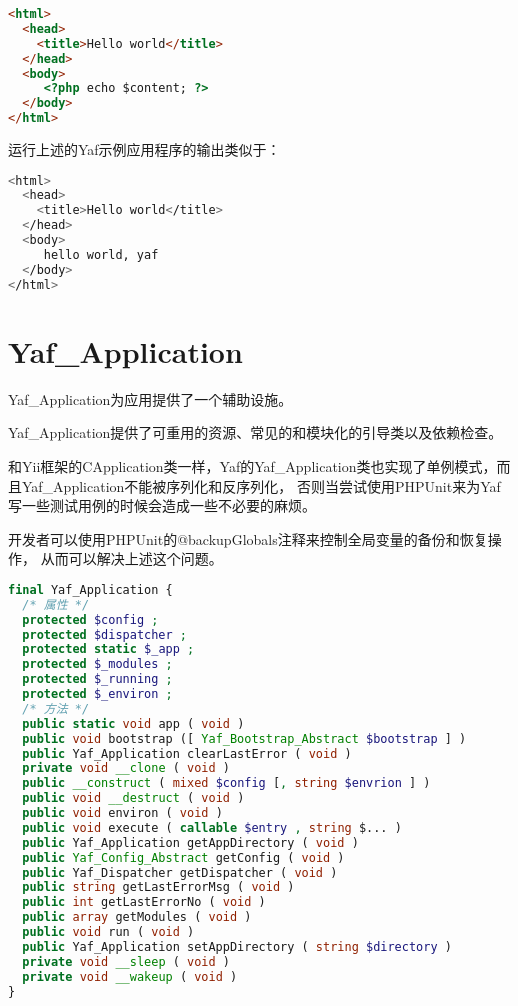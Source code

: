 \begin{lstlisting}[language=HTML]
<html>
  <head>
    <title>Hello world</title>
  </head>
  <body>
     <?php echo $content; ?>
  </body>
</html>
\end{lstlisting}

运行上述的Yaf示例应用程序的输出类似于：


\begin{lstlisting}[language=bash]
<html>
  <head>
    <title>Hello world</title>
  </head>
  <body>
     hello world, yaf
  </body>
</html>
\end{lstlisting}


\chapter{Yaf\_Application}

Yaf\_Application为应用提供了一个辅助设施。

Yaf\_Application提供了可重用的资源、常见的和模块化的引导类以及依赖检查。

和Yii框架的CApplication类一样，Yaf的Yaf\_Application类也实现了单例模式，而且Yaf\_Application不能被序列化和反序列化， 否则当尝试使用PHPUnit来为Yaf写一些测试用例的时候会造成一些不必要的麻烦。

开发者可以使用PHPUnit的@backupGlobals注释来控制全局变量的备份和恢复操作， 从而可以解决上述这个问题。




\begin{lstlisting}[language=PHP]
final Yaf_Application {
  /* 属性 */
  protected $config ;
  protected $dispatcher ;
  protected static $_app ;
  protected $_modules ;
  protected $_running ;
  protected $_environ ;
  /* 方法 */
  public static void app ( void )
  public void bootstrap ([ Yaf_Bootstrap_Abstract $bootstrap ] )
  public Yaf_Application clearLastError ( void )
  private void __clone ( void )
  public __construct ( mixed $config [, string $envrion ] )
  public void __destruct ( void )
  public void environ ( void )
  public void execute ( callable $entry , string $... )
  public Yaf_Application getAppDirectory ( void )
  public Yaf_Config_Abstract getConfig ( void )
  public Yaf_Dispatcher getDispatcher ( void )
  public string getLastErrorMsg ( void )
  public int getLastErrorNo ( void )
  public array getModules ( void )
  public void run ( void )
  public Yaf_Application setAppDirectory ( string $directory )
  private void __sleep ( void )
  private void __wakeup ( void )
}
\end{lstlisting}

